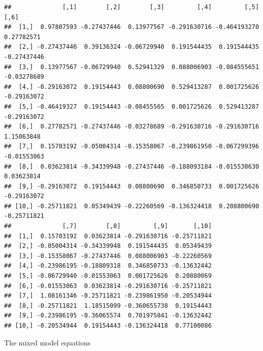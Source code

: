 \documentclass[
]{article}
\begin{document}
\begin{verbatim}
##              [,1]        [,2]        [,3]         [,4]         [,5]        [,6]
##  [1,]  0.97807593 -0.27437446  0.13977567 -0.291630716 -0.464193270  0.27782571
##  [2,] -0.27437446  0.39136324 -0.06729940  0.191544435  0.191544435 -0.27437446
##  [3,]  0.13977567 -0.06729940  0.52941329  0.088006903 -0.084555651 -0.03278689
##  [4,] -0.29163072  0.19154443  0.08800690  0.529413287  0.001725626 -0.29163072
##  [5,] -0.46419327  0.19154443 -0.08455565  0.001725626  0.529413287 -0.29163072
##  [6,]  0.27782571 -0.27437446 -0.03278689 -0.291630716 -0.291630716  1.15063848
##  [7,]  0.15703192 -0.05004314 -0.15358067 -0.239861950 -0.067299396 -0.01553063
##  [8,]  0.03623814 -0.34339948 -0.27437446 -0.188093184 -0.015530630  0.03623814
##  [9,] -0.29163072  0.19154443  0.08800690  0.346850733  0.001725626 -0.29163072
## [10,] -0.25711821  0.05349439 -0.22260569 -0.136324418  0.208800690 -0.25711821
##              [,7]        [,8]         [,9]       [,10]
##  [1,]  0.15703192  0.03623814 -0.291630716 -0.25711821
##  [2,] -0.05004314 -0.34339948  0.191544435  0.05349439
##  [3,] -0.15358067 -0.27437446  0.088006903 -0.22260569
##  [4,] -0.23986195 -0.18809318  0.346850733 -0.13632442
##  [5,] -0.06729940 -0.01553063  0.001725626  0.20880069
##  [6,] -0.01553063  0.03623814 -0.291630716 -0.25711821
##  [7,]  1.08161346 -0.25711821 -0.239861950 -0.20534944
##  [8,] -0.25711821  1.18515099 -0.360655738  0.19154443
##  [9,] -0.23986195 -0.36065574  0.701975841 -0.13632442
## [10,] -0.20534944  0.19154443 -0.136324418  0.77100086
\end{verbatim}

The mixed model equations
\end{document}

